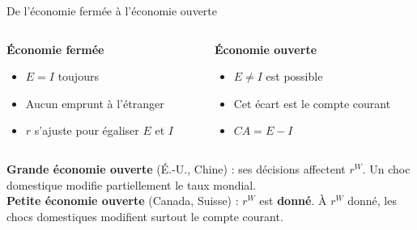 \documentclass[aspectratio=169]{beamer}
\begin{document}

\begin{frame}[t]{De l'économie fermée à l'économie ouverte}
   \small
   \vspace{0.1cm}
   \begin{columns}[T,onlytextwidth]
      \begin{column}{0.485\textwidth}
         \begin{tcolorbox}[colback=HECnavy!5, colframe=HECnavy!5, boxrule=0pt, arc=7pt, boxsep=0pt, left=9pt, right=9pt, before skip=0pt, after skip=0pt, top=6pt, bottom=6pt]
            \textbf{\textcolor{HECnavy}{Économie fermée}}
            \vspace{0.08cm}
            \begin{itemize}
               \setlength\itemsep{0.12cm}
               \item $E = I$ toujours
               \item Aucun emprunt à l'étranger
               \item $r$ s'ajuste pour égaliser $E$ et $I$
            \end{itemize}
         \end{tcolorbox}
      \end{column}
      \begin{column}{0.485\textwidth}
         \begin{tcolorbox}[colback=HECgreen!7, colframe=HECgreen!7, boxrule=0pt, arc=7pt, boxsep=0pt, left=9pt, right=9pt, before skip=0pt, after skip=0pt, top=6pt, bottom=6pt]
            \textbf{\textcolor{HECnavy}{Économie ouverte}}
            \vspace{0.08cm}
            \begin{itemize}
               \setlength\itemsep{0.12cm}
               \item $E \neq I$ est possible
               \item Cet écart est le compte courant
               \item $CA = E - I$
            \end{itemize}
         \end{tcolorbox}
      \end{column}
   \end{columns}
   \vspace{0.22cm}
   \begin{tcolorbox}[
      colback=HECcoral!6, colframe=HECcoral!6, boxrule=0pt, leftrule=3pt, arc=8pt,
      left=10pt, right=10pt, top=6pt, bottom=6pt,
      title={Petite vs grande économie ouverte}, coltitle=HECnavy,
      fonttitle=\bfseries, attach title to upper={\\[4pt]}]
      \RaggedRight{}
      \footnotesize
      \textbf{Grande économie ouverte} (É.-U., Chine) : ses décisions affectent $r^W$. Un choc domestique modifie partiellement le taux mondial.\\[4pt]
      \textbf{Petite économie ouverte} (Canada, Suisse) : $r^W$ est \textbf{donné}. À $r^W$ donné, les chocs domestiques modifient surtout le compte courant.
   \end{tcolorbox}
\end{frame}
\end{document}
